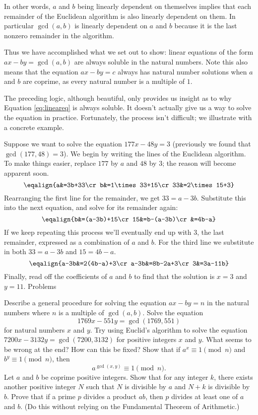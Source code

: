 In other words, $a$ and $b$ being linearly dependent on themselves implies that each remainder
of the Euclidean algorithm is also linearly dependent on them. In particular $\gcd(a,b)$ is linearly
dependent on $a$ and $b$ because it is the last nonzero remainder in the algorithm.

Thus we have accomplished what we set out to show: linear equations
of the form $ax-by=\gcd(a,b)$ are always soluble in the natural numbers. Note  this also means
that the equation $ax-by=c$ always has natural number solutions when $a$ and $b$ are coprime, as
every natural number is a multiple of $1$.

The preceding logic, although beautiful, only provides us insight as to why
Equation \eqref{eq:lineareq} is always soluble. It doesn't actually give us a way to solve
the equation in practice. Fortunately, the process isn't difficult; we illustrate with  a concrete example.

Suppose we want to solve the equation $177x-48y=3$ (previously we 
found that $\gcd(177,48)=3$). We begin by writing the lines of the Euclidean algorithm. To make
things easier, replace $177$ by $a$ and $48$ by $3$; the reason will become apparent soon.
$$\eqalign{a&=3b+33\cr b&=1\times33+15\cr33&=2\times15+3}$$
Rearranging the first line for the remainder, we get $33=a-3b$. Substitute this into the next equation, and solve
for its remainder again:
$$\eqalign{b&=(a-3b)+15\cr15&=b-(a-3b)\cr&=4b-a}$$
If we keep repeating this process  we'll eventually end up with $3$, the last remainder, expressed
as a combination of $a$ and $b$. For the third line we substitute in both
$33=a-3b$ and $15=4b-a$.
$$\eqalign{a-3b&=2(4b-a)+3\cr a-3b&=8b-2a+3\cr3&=3a-11b}$$
Finally, read off the coefficients of $a$ and $b$ to find that the solution is $x=3$ and $y=11$.
\beginsection Problems

\numberedlist
\li Describe a general procedure for solving the equation $ax-by=n$ in the
natural numbers where $n$ is a multiple of $\gcd(a,b)$.
\li Solve the equation $$1769x-551y=\gcd(1769,551)$$ for natural numbers $x$ and $y$.
\li Try using Euclid's algorithm to solve the equation $7200x-3132y=\gcd(7200,3132)$ for positive integers $x$ and $y$. What seems to be wrong at the end?
How can this be fixed?
\li Show that if $a^x\equiv1\pmod{n}$ and $b^y\equiv1\pmod{n}$, then
$$a^{\gcd(x,y)}\equiv1\pmod{n}.$$
\li Let $a$ and $b$ be coprime positive integers. Show that for
any integer $k$, there exists another positive integer $N$ such
that $N$ is divisible by $a$ and $N+k$ is divisible by $b$.
\li Prove that if a prime $p$ divides a product $ab$, then $p$ divides
at least one of $a$ and $b$. (Do this without relying on the Fundamental
Theorem of Arithmetic.)
\endnumberedlist
\bye
